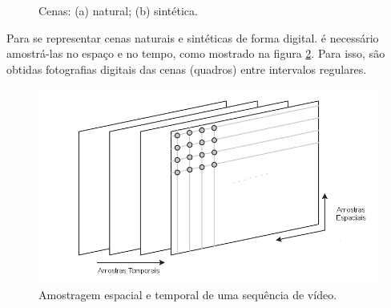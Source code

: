 \begin{figure}[h]
    \centering
    \qquad
    \caption{Cenas: (a) natural; (b) sintética.}%
	    
    \label{fig:RGB}%
\end{figure}
Para se representar cenas naturais e sintéticas de forma digital. é necessário amostrá-las no espaço e no tempo, como mostrado na figura \ref{AMOSTRAGEM_VIDEO}. Para isso, são obtidas fotografias digitais das cenas (quadros) entre intervalos regulares.
\cite{garcia2013tecnicas}

\begin{figure}[h]
	\centering
	\includegraphics[scale=0.65]{figuras/AMOSTRAGEM_VIDEO.png}
	\caption{Amostragem espacial e temporal de uma sequência de vídeo.}
	\label{AMOSTRAGEM_VIDEO}
\end{figure}

